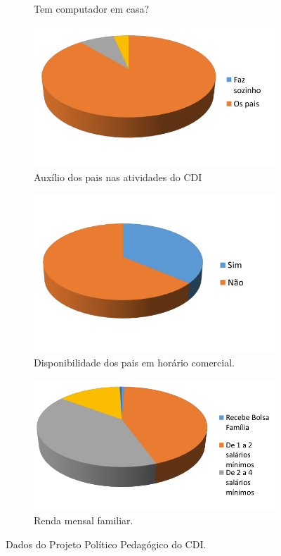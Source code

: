 \begin{figure}[!htbp]
\begin{subfigure}{.3\textwidth}
       \caption{Tem computador em casa?}
       \label{fig:tem_computador}
   \end{subfigure}
   \begin{subfigure}{.3\textwidth}
       \includegraphics[width=.9\linewidth,fbox]{figs/cdi/pai_auxilia_crianca_atividades.png}
       \caption{Auxílio dos pais nas atividades do CDI}
       \label{fig:pai_auxilia_crianca_atividades}
   \end{subfigure}%
   \begin{subfigure}{.3\textwidth}
       \includegraphics[width=.9\linewidth,fbox]{figs/cdi/disponibilidade_pais_horario_comercial.png}
       \caption{Disponibilidade dos pais em horário comercial.}
       \label{fig:disponibilidade_pais_horario_comercial}
   \end{subfigure}%
    \begin{subfigure}{.3\textwidth}
       \includegraphics[width=.9\linewidth,fbox]{figs/cdi/renda.png}
       \caption{Renda mensal familiar.}
       \label{fig:renda}
   \end{subfigure}%
   \caption{Dados do Projeto Político Pedagógico do CDI.}
   \label{fig:contexto_ppp}
\end{figure}
